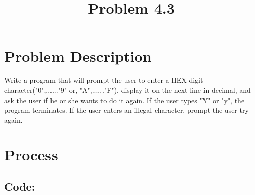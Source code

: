 \clearpage
\title{Problem 4.3}
\author{}
\date{}
\maketitle

\section*{Problem Description}
Write a program that will prompt the user to enter a HEX digit character("0",......"9" or, "A",......"F"), display it on the next line in decimal, and ask the user if he or she wants to do it again. If the user types "Y" or "y", the program terminates. If the user enters an illegal character. prompt the user try again.

\section*{Process}
\subsection*{Code:}

